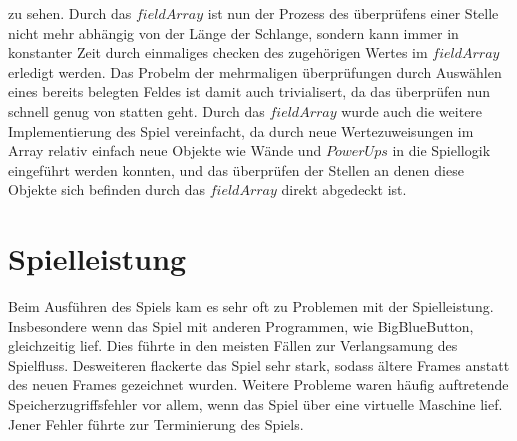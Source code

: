 zu sehen.
Durch das $fieldArray$ ist nun der Prozess des {\"u}berpr{\"u}fens einer Stelle nicht mehr abh{\"a}ngig von der L{\"a}nge der Schlange, sondern kann immer in konstanter Zeit durch einmaliges checken des zugeh{\"o}rigen Wertes im $fieldArray$ erledigt werden. Das Probelm der mehrmaligen {\"u}berpr{\"u}fungen durch Ausw{\"a}hlen eines bereits belegten Feldes ist damit auch trivialisert, da das {\"u}berpr{\"u}fen nun schnell genug von statten geht. Durch das $fieldArray$ wurde auch die weitere Implementierung des Spiel vereinfacht, da durch neue Wertezuweisungen im Array relativ einfach neue Objekte wie W{\"a}nde und $PowerUps$ in die Spiellogik eingef{\"u}hrt werden konnten, und das {\"u}berpr{\"u}fen der Stellen an denen diese Objekte sich befinden durch das $fieldArray$ direkt abgedeckt ist.
%

%
\section{Spielleistung}
\label{Spielleistung}
%
Beim Ausf{\"u}hren des Spiels kam es sehr oft zu Problemen mit der Spielleistung. Insbesondere wenn das Spiel mit anderen Programmen, wie BigBlueButton, gleichzeitig lief. Dies f{\"u}hrte in den meisten F{\"a}llen zur Verlangsamung des Spielfluss. Desweiteren flackerte das Spiel sehr stark, sodass {\"a}ltere Frames anstatt des neuen Frames gezeichnet wurden. Weitere Probleme waren h{\"a}ufig auftretende Speicherzugriffsfehler vor allem, wenn das Spiel {\"u}ber eine virtuelle Maschine lief. Jener Fehler f{\"u}hrte zur Terminierung des Spiels.  
%
